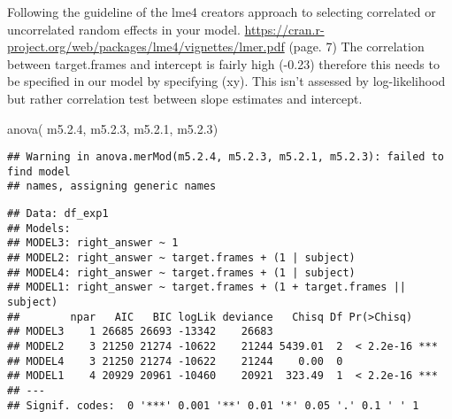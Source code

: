\documentclass[
]{article}
\newenvironment{Shaded}{\begin{snugshade}}{\end{snugshade}}
\newcommand{\FloatTok}[1]{\textcolor[rgb]{0.00,0.00,0.81}{#1}}
\newcommand{\FunctionTok}[1]{\textcolor[rgb]{0.00,0.00,0.00}{#1}}
\newcommand{\NormalTok}[1]{#1}
\begin{document}
Following the guideline of the lme4 creators approach to selecting
correlated or uncorrelated random effects in your model.
\url{https://cran.r-project.org/web/packages/lme4/vignettes/lmer.pdf}
(page. 7) The correlation between target.frames and intercept is fairly
high (-0.23) therefore this needs to be specified in our model by
specifying (x\textbar y). This isn't assessed by log-likelihood but
rather correlation test between slope estimates and intercept.

\begin{Shaded}
\begin{Highlighting}[]
\FunctionTok{anova}\NormalTok{( m5.}\FloatTok{2.4}\NormalTok{, m5.}\FloatTok{2.3}\NormalTok{, m5.}\FloatTok{2.1}\NormalTok{, m5.}\FloatTok{2.3}\NormalTok{)}
\end{Highlighting}
\end{Shaded}

\begin{verbatim}
## Warning in anova.merMod(m5.2.4, m5.2.3, m5.2.1, m5.2.3): failed to find model
## names, assigning generic names
\end{verbatim}

\begin{verbatim}
## Data: df_exp1
## Models:
## MODEL3: right_answer ~ 1
## MODEL2: right_answer ~ target.frames + (1 | subject)
## MODEL4: right_answer ~ target.frames + (1 | subject)
## MODEL1: right_answer ~ target.frames + (1 + target.frames || subject)
##        npar   AIC   BIC logLik deviance   Chisq Df Pr(>Chisq)    
## MODEL3    1 26685 26693 -13342    26683                          
## MODEL2    3 21250 21274 -10622    21244 5439.01  2  < 2.2e-16 ***
## MODEL4    3 21250 21274 -10622    21244    0.00  0               
## MODEL1    4 20929 20961 -10460    20921  323.49  1  < 2.2e-16 ***
## ---
## Signif. codes:  0 '***' 0.001 '**' 0.01 '*' 0.05 '.' 0.1 ' ' 1
\end{verbatim}
\end{document}
